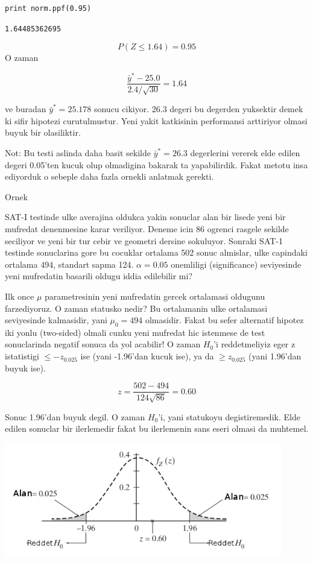 \documentclass[12pt,fleqn]{article}\usepackage{../common}
\begin{document}
\begin{verbatim}
print norm.ppf(0.95)
\end{verbatim}

\begin{verbatim}
1.64485362695
\end{verbatim}


$$ P(Z \le 1.64)  = 0.95 $$
O zaman 

$$ \frac{\bar{y}^* - 25.0}{2.4 / \sqrt{30}} = 1.64 $$

ve buradan $\bar{y}^* = 25.178$ sonucu cikiyor. 26.3 degeri bu degerden
yuksektir demek ki sifir hipotezi curutulmustur. Yeni yakit katkisinin
performansi arttiriyor olmasi buyuk bir olasiliktir. 

Not: Bu testi aslinda daha basit sekilde $\bar{y}^* = 26.3$ degerlerini
vererek elde edilen degeri 0.05'ten kucuk olup olmadigina bakarak ta
yapabilirdik. Fakat metotu insa ediyorduk o sebeple daha fazla ornekli
anlatmak gerekti. 

Ornek

SAT-I testinde ulke averajina oldukca yakin sonuclar alan bir lisede yeni
bir mufredat denenmesine karar veriliyor. Deneme icin 86 ogrenci rasgele
sekilde seciliyor ve yeni bir tur cebir ve geometri dersine
sokuluyor. Sonraki SAT-1 testinde sonuclarina gore bu cocuklar ortalama 502
sonuc almislar, ulke capindaki ortalama 494, standart sapma
124. $\alpha=0.05$ onemliligi (significance) seviyesinde yeni mufredatin
basarili oldugu iddia edilebilir mi? 

Ilk once $\mu$ parametresinin yeni mufredatin gercek ortalamasi oldugunu
farzediyoruz. O zaman statusko nedir? Bu ortalamanin ulke ortalamasi
seviyesinde kalmasidir, yani $\mu_0 = 494$ olmasidir. Fakat bu sefer
alternatif hipotez iki yonlu (two-sided) olmali cunku yeni mufredat hic
istenmese de test sonuclarinda negatif sonuca da yol acabilir! O zaman
$H_0$'i reddetmeliyiz eger z istatistigi $\le -z_{0.025}$ ise (yani
-1.96'dan kucuk ise), ya da $\ge z_{0.025}$ (yani 1.96'dan buyuk ise). 

$$ z = \frac{502-494}{124\sqrt{86}} = 0.60$$

Sonuc 1.96'dan buyuk degil. O zaman $H_0$'i, yani statukoyu
degistiremedik. Elde edilen sonuclar bir ilerlemedir fakat bu ilerlemenin sans
eseri olmasi da muhtemel.

\includegraphics[height=5cm]{sat1.png}
\end{document}
